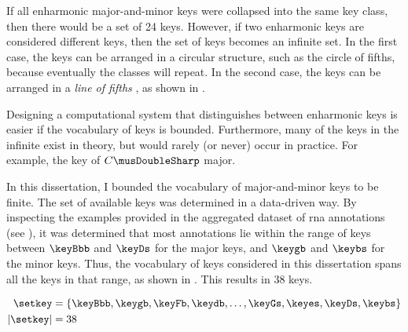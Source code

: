 
If all enharmonic major-and-minor keys were collapsed into
the same key class, then there would be a set of 24 keys.
However, if two enharmonic keys are considered different
keys, then the set of keys becomes an infinite set. In the
first case, the keys can be arranged in a circular
structure, such as the circle of fifths, because eventually
the classes will repeat. In the second case, the keys can be
arranged in a \emph{line of fifths}
\parencite{temperley2000line}, as shown in
.


Designing a computational system that distinguishes between
enharmonic keys is easier if the vocabulary of keys is
bounded. Furthermore, many of the keys in the infinite exist
in theory, but would rarely (or never) occur in practice.
For example, the key of $C\musDoubleSharp$ major.

In this dissertation, I bounded the vocabulary of
major-and-minor keys to be finite. The set of available keys
was determined in a data-driven way. By inspecting the
examples provided in the aggregated dataset of \gls{rna}
annotations (see ),
it was determined that most annotations lie within the range
of keys between $\keyBbb$ and $\keyDs$ for the major keys,
and $\keygb$ and $\keybs$ for the minor keys. Thus, the
vocabulary of keys considered in this dissertation spans all
the keys in that range, as shown in . This
results in 38 keys.

\begin{equation}
    \label{eq:keys}
    \begin{split}
    \setkey &= \{ \keyBbb, \keygb, \keyFb, \keydb, \dotsc,
    \keyGs, \keyes, \keyDs, \keybs \}\\
    | \setkey | &= 38
    \end{split}
\end{equation}
